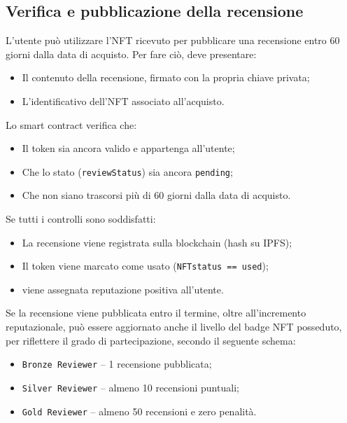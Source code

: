         \subsection{Verifica e pubblicazione della recensione}
            L'utente può utilizzare l’NFT ricevuto per pubblicare una recensione entro 60 giorni dalla data di acquisto. Per fare ciò, deve presentare:
                \begin{itemize}
                    \item Il contenuto della recensione, firmato con la propria chiave privata;
                    
                    \item L'identificativo dell'NFT associato all'acquisto.
                \end{itemize}
        
            \noindent Lo smart contract verifica che:
                \begin{itemize}
                    \item Il token sia ancora valido e appartenga all'utente;
                    
                    \item Che lo stato (\texttt{reviewStatus}) sia ancora \texttt{pending};
                    
                    \item Che non siano trascorsi più di 60 giorni dalla data di acquisto.
                \end{itemize}
        
            \noindent Se tutti i controlli sono soddisfatti:
                \begin{itemize}
                    \item La recensione viene registrata sulla blockchain (hash su IPFS);
                    
                    \item Il token viene marcato come usato (\texttt{NFTstatus == used});
                    
                    \item viene assegnata reputazione positiva all'utente.
                \end{itemize}

            \noindent Se la recensione viene pubblicata entro il termine, oltre all'incremento reputazionale, può essere aggiornato anche il livello del badge NFT posseduto, per riflettere il grado di partecipazione, secondo il seguente schema:
                \begin{itemize}
                    \item \texttt{Bronze Reviewer} – 1 recensione pubblicata;
                    
                    \item \texttt{Silver Reviewer} – almeno 10 recensioni puntuali;
                    
                    \item \texttt{Gold Reviewer} – almeno 50 recensioni e zero penalità.
                \end{itemize}

